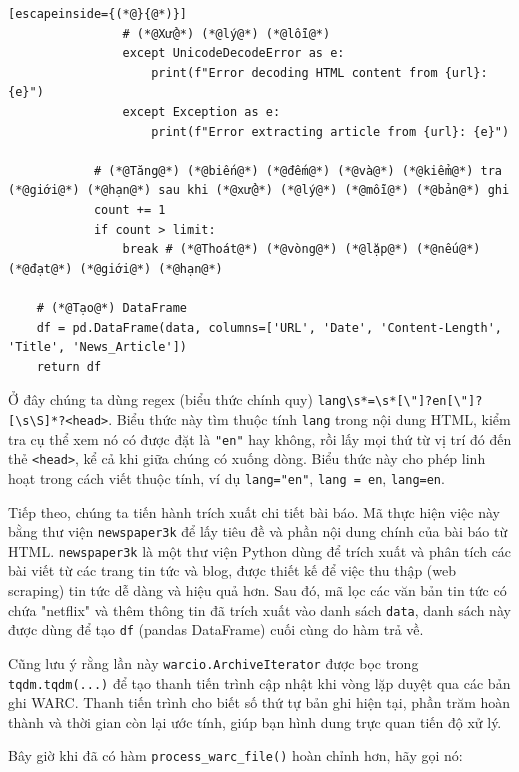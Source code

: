 \begin{lstlisting}[escapeinside={(*@}{@*)}]
                # (*@Xử@*) (*@lý@*) (*@lỗi@*)
                except UnicodeDecodeError as e:
                    print(f"Error decoding HTML content from {url}: {e}")
                except Exception as e:
                    print(f"Error extracting article from {url}: {e}")

            # (*@Tăng@*) (*@biến@*) (*@đếm@*) (*@và@*) (*@kiểm@*) tra (*@giới@*) (*@hạn@*) sau khi (*@xử@*) (*@lý@*) (*@mỗi@*) (*@bản@*) ghi
            count += 1
            if count > limit:
                break # (*@Thoát@*) (*@vòng@*) (*@lặp@*) (*@nếu@*) (*@đạt@*) (*@giới@*) (*@hạn@*)

    # (*@Tạo@*) DataFrame
    df = pd.DataFrame(data, columns=['URL', 'Date', 'Content-Length', 'Title', 'News_Article'])
    return df
\end{lstlisting}

Ở đây chúng ta dùng regex (biểu thức chính quy) \texttt{lang\textbackslash{}s*=\textbackslash{}s*{[}\textbackslash{}\textquotesingle{}"{]}?en{[}\textbackslash{}\textquotesingle{}"{]}?{[}\textbackslash{}s\textbackslash{}S{]}*?\textless{}head\textgreater{}}. Biểu thức này tìm thuộc tính \texttt{lang} trong nội dung HTML, kiểm tra cụ thể xem nó có được đặt là \texttt{"en"} hay không, rồi lấy mọi thứ từ vị trí đó đến thẻ \texttt{\textless{}head\textgreater{}}, kể cả khi giữa chúng có xuống dòng. Biểu thức này cho phép linh hoạt trong cách viết thuộc tính, ví dụ \texttt{lang="en"}, \texttt{lang\ =\ \textquotesingle{}en\textquotesingle{}}, \texttt{lang=en}.

Tiếp theo, chúng ta tiến hành trích xuất chi tiết bài báo. Mã thực hiện việc này bằng thư viện \texttt{newspaper3k} để lấy tiêu đề và phần nội dung chính của bài báo từ HTML. \texttt{newspaper3k} là một thư viện Python dùng để trích xuất và phân tích các bài viết từ các trang tin tức và blog, được thiết kế để việc thu thập (web scraping) tin tức dễ dàng và hiệu quả hơn. Sau đó, mã lọc các văn bản tin tức có chứa "netflix" và thêm thông tin đã trích xuất vào danh sách \texttt{data}, danh sách này được dùng để tạo \texttt{df} (pandas DataFrame) cuối cùng do hàm trả về.

Cũng lưu ý rằng lần này \texttt{warcio.ArchiveIterator} được bọc trong \texttt{tqdm.tqdm(...)} để tạo thanh tiến trình cập nhật khi vòng lặp duyệt qua các bản ghi WARC. Thanh tiến trình cho biết số thứ tự bản ghi hiện tại, phần trăm hoàn thành và thời gian còn lại ước tính, giúp bạn hình dung trực quan tiến độ xử lý.

Bây giờ khi đã có hàm \texttt{process\_warc\_file()} hoàn chỉnh hơn, hãy gọi nó:

